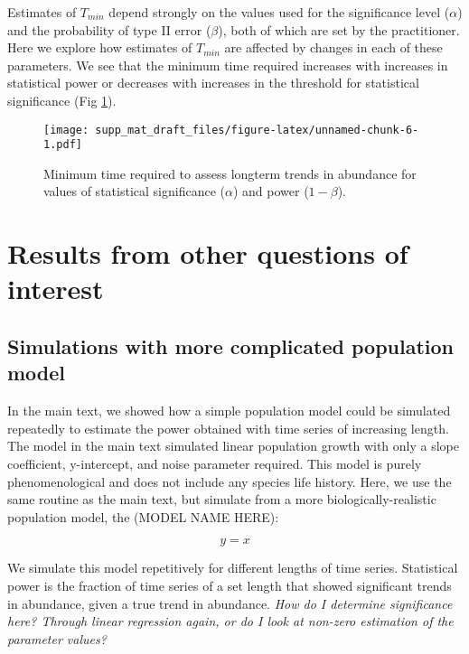 \documentclass[12pt,]{article}
\begin{document}
Estimates of \(T_{min}\) depend strongly on the values used for the
significance level (\(\alpha\)) and the probability of type II error
(\(\beta\)), both of which are set by the practitioner. Here we explore
how estimates of \(T_{min}\) are affected by changes in each of these
parameters. We see that the minimum time required increases with
increases in statistical power or decreases with increases in the
threshold for statistical significance (Fig
\ref{fig:min_time_vs_alpha_beta}).

\begin{figure}[htbp]
\centering
\texttt{[image: supp\_mat\_draft\_files/figure-latex/unnamed-chunk-6-1.pdf]}
\caption{Minimum time required to assess longterm trends in abundance
for values of statistical significance (\(\alpha\)) and power
(\(1-\beta\)).\label{fig:min_time_vs_alpha_beta}}
\end{figure}

\pagebreak

\section{Results from other questions of
interest}\label{results-from-other-questions-of-interest}

\subsection{Simulations with more complicated population
model}\label{simulations-with-more-complicated-population-model}

In the main text, we showed how a simple population model could be
simulated repeatedly to estimate the power obtained with time series of
increasing length. The model in the main text simulated linear
population growth with only a slope coefficient, y-intercept, and noise
parameter required. This model is purely phenomenological and does not
include any species life history. Here, we use the same routine as the
main text, but simulate from a more biologically-realistic population
model, the (MODEL NAME HERE):

\begin{equation}
    y = x
  \end{equation}

We simulate this model repetitively for different lengths of time
series. Statistical power is the fraction of time series of a set length
that showed significant trends in abundance, given a true trend in
abundance. \emph{How do I determine significance here? Through linear
regression again, or do I look at non-zero estimation of the parameter
values?}
\end{document}
